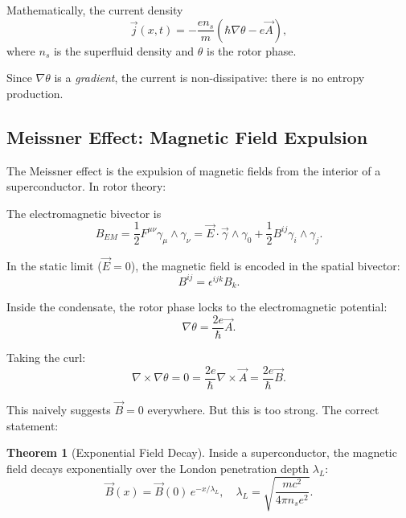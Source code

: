 \documentclass[12pt,a4paper]{article}
\theoremstyle{definition}
\newtheorem{theorem}{Theorem}[section]
\theoremstyle{remark}
\begin{document}
Mathematically, the current density
\begin{equation}
\vec{j}(x,t) = -\frac{e n_s}{m} \left( \hbar \nabla \theta - e \vec{A} \right),
\end{equation}
where $n_s$ is the superfluid density and $\theta$ is the rotor phase.

Since $\nabla \theta$ is a \emph{gradient}, the current is non-dissipative: there is no entropy production.

\subsection{Meissner Effect: Magnetic Field Expulsion}

The Meissner effect is the expulsion of magnetic fields from the interior of a superconductor. In rotor theory:

The electromagnetic bivector is
\begin{equation}
B_{EM} = \frac{1}{2} F^{\mu\nu} \gamma_\mu \wedge \gamma_\nu = \vec{E} \cdot \vec{\gamma} \wedge \gamma_0 + \frac{1}{2} B^{ij} \gamma_i \wedge \gamma_j.
\end{equation}

In the static limit ($\vec{E} = 0$), the magnetic field is encoded in the spatial bivector:
\begin{equation}
B^{ij} = \epsilon^{ijk} B_k.
\end{equation}

Inside the condensate, the rotor phase locks to the electromagnetic potential:
\begin{equation}
\nabla \theta = \frac{2e}{\hbar} \vec{A}.
\end{equation}

Taking the curl:
\begin{equation}
\nabla \times \nabla \theta = 0 = \frac{2e}{\hbar} \nabla \times \vec{A} = \frac{2e}{\hbar} \vec{B}.
\end{equation}

This naively suggests $\vec{B} = 0$ everywhere. But this is too strong. The correct statement:

\begin{theorem}[Exponential Field Decay]
Inside a superconductor, the magnetic field decays exponentially over the London penetration depth $\lambda_L$:
\begin{equation}
\vec{B}(x) = \vec{B}(0) \, e^{-x/\lambda_L}, \quad \lambda_L = \sqrt{\frac{m c^2}{4\pi n_s e^2}}.
\end{equation}
\end{theorem}
\end{document}
